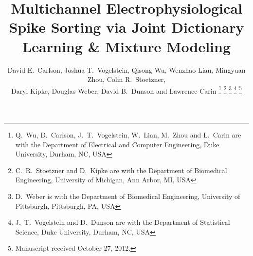 \documentclass[journal]{IEEEtran}
\begin{document}

%
\title{
{Multichannel Electrophysiological Spike Sorting via Joint Dictionary Learning \& Mixture Modeling}
}%
%



%

\author{David E.\ Carlson, Joshua T.\ Vogelstein, Qisong Wu, Wenzhao Lian, Mingyuan Zhou, Colin R.\ Stoetzner,  \\ Daryl Kipke, Douglas Weber,  David B.\ Dunson and Lawrence Carin%
\thanks{Q.\ Wu, D.\  Carlson, J.\ T.\ Vogelstein,  W.\  Lian, M.\  Zhou and L.\  Carin are with the Department
of Electrical and Computer Engineering, Duke University, Durham, NC, USA}%
\thanks{C.\ R.\  Stoetzner and D.\  Kipke are with the Department of Biomedical Engineering, University of Michigan, Ann Arbor, MI, USA}%
\thanks{D.\  Weber is with the Department of Biomedical Engineering, University of Pittsburgh, Pittsburgh, PA, USA}%
\thanks{J.\ T.\ Vogelstein and D.\  Dunson are with the Department of Statistical Science, Duke University, Durham, NC, USA}
\thanks{Manuscript received October 27, 2012.}}

%
%
\end{document}
